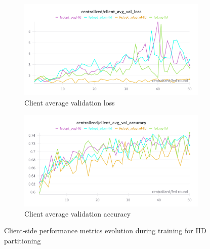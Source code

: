 \documentclass[11pt]{article}
\begin{document}
    \begin{figure}[h]
        \centering
        \begin{subfigure}[b]{0.48\textwidth}
            \centering
            \includegraphics[width=\textwidth]{img/experiment_1/iid_client_avg_val_loss}
            \caption{Client average validation loss}
            \label{fig:iid_val_loss}
        \end{subfigure}
        \hfill
        \begin{subfigure}[b]{0.48\textwidth}
            \centering
            \includegraphics[width=\textwidth]{img/experiment_1/iid_client_avg_val_acc}
            \caption{Client average validation accuracy}
            \label{fig:iid_val_acc}
        \end{subfigure}
        \caption{Client-side performance metrics evolution during training for IID partitioning}
        \label{fig:iid_client_metrics}
    \end{figure}
\end{document}
